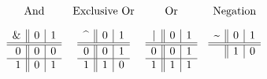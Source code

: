 $$
\begin{array}{cccc}
\mbox{And} & \mbox{Exclusive Or} & \mbox{Or} & \mbox{Negation}
\\[1em]
\begin{array}[t]{r||c|c}
      \lstinline'&' & 0 & 1
\\\hline\hline   0  & 0 & 0
\\\hline         1  & 0 & 1
\end{array}
&
\begin{array}[t]{r||c|c}
      \lstinline'^' & 0 & 1
\\\hline\hline   0  & 0 & 1
\\\hline         1  & 1 & 0
\\ \end{array}
&
\begin{array}[t]{r||c|c}
      \lstinline'|' & 0 & 1
\\\hline\hline   0  & 0 & 1
\\\hline         1  & 1 & 1
\end{array}
&
\begin{array}[t]{r||c|c}
      \lstinline'~' & 0 & 1
\\\hline\hline      & 1 & 0
\end{array}
\end{array}
$$





